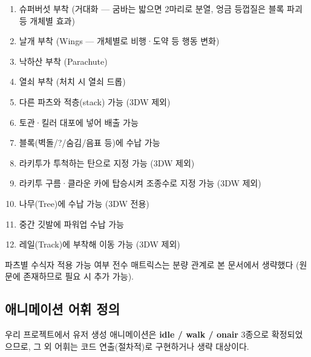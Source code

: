 \documentclass[10pt,a4paper]{article}
\begin{document}
\begin{enumerate}
  \item 슈퍼버섯 부착 (거대화 --- 굼바는 밟으면 2마리로 분열, 엉금 등껍질은 블록 파괴 등 개체별 효과)
  \item 날개 부착 (Wings --- 개체별로 비행·도약 등 행동 변화)
  \item 낙하산 부착 (Parachute)
  \item 열쇠 부착 (처치 시 열쇠 드롭)
  \item 다른 파츠와 적층(stack) 가능 (3DW 제외)
  \item 토관·킬러 대포에 넣어 배출 가능
  \item 블록(벽돌/?/숨김/음표 등)에 수납 가능
  \item 라키투가 투척하는 탄으로 지정 가능 (3DW 제외)
  \item 라키투 구름·클라운 카에 탑승시켜 조종수로 지정 가능 (3DW 제외)
  \item 나무(Tree)에 수납 가능 (3DW 전용)
  \item 중간 깃발에 파워업 수납 가능
  \item 레일(Track)에 부착해 이동 가능 (3DW 제외)
\end{enumerate}

파츠별 수식자 적용 가능 여부 전수 매트릭스는 분량 관계로 본 문서에서
생략했다 (원문에 존재하므로 필요 시 추가 가능).

\subsection{애니메이션 어휘 정의}\label{sec:anim}

우리 프로젝트에서 유저 생성 애니메이션은 \textbf{idle / walk / onair} 3종으로
확정되었으므로, 그 외 어휘는 코드 연출(절차적)로 구현하거나 생략 대상이다.
\end{document}

